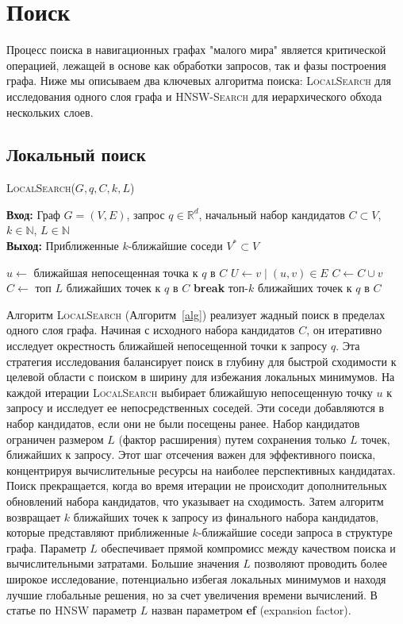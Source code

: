 \documentclass{article}
\begin{document}
\section{Поиск}
Процесс поиска в навигационных графах "малого мира" является критической операцией, лежащей в основе как обработки запросов, так и фазы построения графа. Ниже мы описываем два ключевых алгоритма поиска: \textsc{LocalSearch} для исследования одного слоя графа и \textsc{HNSW-Search} для иерархического обхода нескольких слоев.
\subsection{Локальный поиск}
\begin{algorithm}
\caption{\textsc{LocalSearch}($G, q, C, k, L$)}\label{alg}
\textbf{Вход:} Граф $G = (V, E)$, запрос $q \in \mathbb{R}^d$, начальный набор кандидатов $C \subset V$, $k \in \mathbb{N}$, $L \in \mathbb{N}$ \\
\textbf{Выход:} Приближенные $k$-ближайшие соседи $V^* \subset V$
\begin{algorithmic}[1]
\State $u \gets$ ближайшая непосещенная точка к $q$ в $C$
\State $U \gets {v \mid (u, v) \in E}$
\State $C \gets C \cup {v}$
\EndIf
\EndFor
{}
\State $C \gets$ топ $L$ ближайших точек к $q$ в $C$
\EndIf
{}
\State \textbf{break}
\EndIf
\EndWhile
\State \Return топ-$k$ ближайших точек к $q$ в $C$
\end{algorithmic}
\end{algorithm}
Алгоритм \textsc{LocalSearch} (Алгоритм~\ref{alg}) реализует жадный поиск в пределах одного слоя графа. Начиная с исходного набора кандидатов $C$, он итеративно исследует окрестность ближайшей непосещенной точки к запросу $q$. Эта стратегия исследования балансирует поиск в глубину для быстрой сходимости к целевой области с поиском в ширину для избежания локальных минимумов.
На каждой итерации \textsc{LocalSearch} выбирает ближайшую непосещенную точку $u$ к запросу и исследует ее непосредственных соседей. Эти соседи добавляются в набор кандидатов, если они не были посещены ранее. Набор кандидатов ограничен размером $L$ (фактор расширения) путем сохранения только $L$ точек, ближайших к запросу. Этот шаг отсечения важен для эффективного поиска, концентрируя вычислительные ресурсы на наиболее перспективных кандидатах.
Поиск прекращается, когда во время итерации не происходит дополнительных обновлений набора кандидатов, что указывает на сходимость. Затем алгоритм возвращает $k$ ближайших точек к запросу из финального набора кандидатов, которые представляют приближенные $k$-ближайшие соседи запроса в структуре графа.
Параметр $L$ обеспечивает прямой компромисс между качеством поиска и вычислительными затратами. Большие значения $L$ позволяют проводить более широкое исследование, потенциально избегая локальных минимумов и находя лучшие глобальные решения, но за счет увеличения времени вычислений. В статье по HNSW параметр $L$ назван параметром \textbf{ef} (expansion factor).
\end{document}
